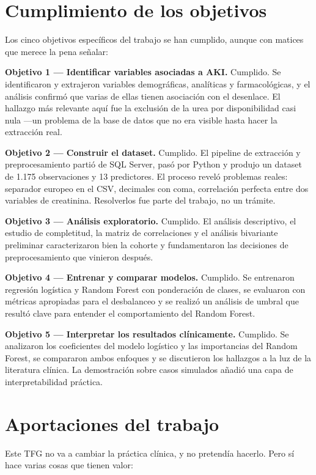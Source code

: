 \documentclass[12pt, a4paper, oneside]{report}
\begin{document}
\section{Cumplimiento de los objetivos}

Los cinco objetivos específicos del trabajo se han cumplido, aunque con matices que merece la pena señalar:

\textbf{Objetivo 1 — Identificar variables asociadas a AKI.}
Cumplido. Se identificaron y extrajeron variables demográficas, analíticas y farmacológicas, y el análisis confirmó que varias de ellas tienen asociación con el desenlace. El hallazgo más relevante aquí fue la exclusión de la urea por disponibilidad casi nula —un problema de la base de datos que no era visible hasta hacer la extracción real.

\textbf{Objetivo 2 — Construir el dataset.}
Cumplido. El pipeline de extracción y preprocesamiento partió de SQL Server, pasó por Python y produjo un dataset de 1.175 observaciones y 13 predictores. El proceso reveló problemas reales: separador europeo en el CSV, decimales con coma, correlación perfecta entre dos variables de creatinina. Resolverlos fue parte del trabajo, no un trámite.

\textbf{Objetivo 3 — Análisis exploratorio.}
Cumplido. El análisis descriptivo, el estudio de completitud, la matriz de correlaciones y el análisis bivariante preliminar caracterizaron bien la cohorte y fundamentaron las decisiones de preprocesamiento que vinieron después.

\textbf{Objetivo 4 — Entrenar y comparar modelos.}
Cumplido. Se entrenaron regresión logística y Random Forest con ponderación de clases, se evaluaron con métricas apropiadas para el desbalanceo y se realizó un análisis de umbral que resultó clave para entender el comportamiento del Random Forest.

\textbf{Objetivo 5 — Interpretar los resultados clínicamente.}
Cumplido. Se analizaron los coeficientes del modelo logístico y las importancias del Random Forest, se compararon ambos enfoques y se discutieron los hallazgos a la luz de la literatura clínica. La demostración sobre casos simulados añadió una capa de interpretabilidad práctica.

\section{Aportaciones del trabajo}

Este TFG no va a cambiar la práctica clínica, y no pretendía hacerlo. Pero sí hace varias cosas que tienen valor:
\end{document}

